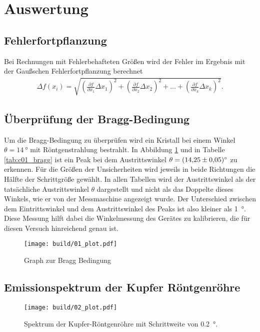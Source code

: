 \section{Auswertung}
\subsection{Fehlerfortpflanzung}
Bei Rechnungen mit Fehlerbehafteten Größen wird der Fehler im Ergebnis mit der Gaußschen Fehlerfortpflanzung berechnet
\begin{align}
    \Delta f(x_i) = \sqrt{
    \left(\frac{\partial f}{\partial x_1} \Delta x_1\right)^2%
     + \left(\frac{\partial f}{\partial x_2} \Delta x_2\right)^2%
     + \dots%
     + \left(\frac{\partial f}{\partial x_k} \Delta x_k\right)^2%
    }.
    \label{eq:gauss}
\end{align}
\subsection{Überprüfung der Bragg-Bedingung}
Um die Bragg-Bedingung zu überprüfen wird ein Kristall bei einem Winkel $\theta = \qty{14}{\degree}$ mit Röntgenstrahlung bestrahlt.
In Abbildung \ref{fig:01} und in Tabelle \ref{tab:c01_bragg} ist ein Peak bei dem Austrittswinkel $\theta= \qty{14.25+-0.05}{\degree}$
zu erkennen. 
Für die Größen der Unsicherheiten wird jeweils in beide Richtungen die Hälfte der Schrittgröße gewählt.
In allen Tabellen wird der Austrittswinkel als der tatsächliche Austrittswinkel $\theta$ dargestellt und nicht als das 
Doppelte dieses Winkels, wie er von der Messmaschine angezeigt wurde.
Der Unterschied zwischen dem Eintrittswinkel und dem Austrittswinkel des Peaks ist also kleiner als \qty{1}{\degree}.
Diese Messung hilft dabei die Winkelmessung des Gerätes zu kalibrieren, die für diesen Versuch hinreichend genau ist.

\begin{figure}[H]
    \centering
    \texttt{[image: build/01\_plot.pdf]}
    \caption{Graph zur Bragg Bedingung}
    \label{fig:01}
\end{figure}

\subsection{Emissionspektrum der Kupfer Röntgenröhre}
\begin{figure}[H]
    \centering
    \texttt{[image: build/02\_plot.pdf]}
    \caption{Spektrum der Kupfer-Röntgenröhre mit Schrittweite von \qty{0.2}{\degree}.}
    \label{fig:02}
\end{figure}

